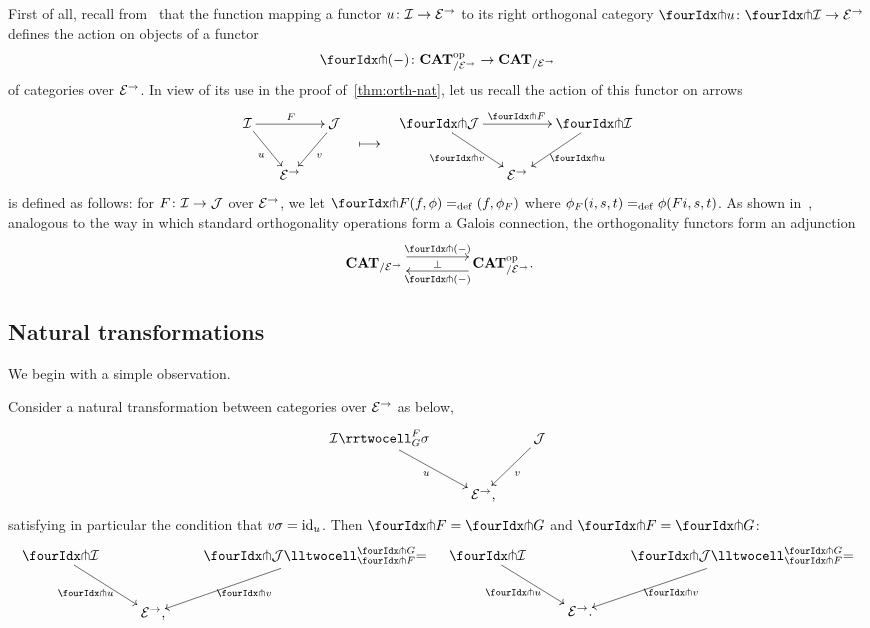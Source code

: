 \documentclass[reqno,10pt,a4paper,oneside,draft]{amsart}
\begin{document}
First of all, recall from~\cite{garner:small-object-argument} that the function mapping a functor $u \colon \mathcal{I} \to \mathcal{E}^\to$ to its right orthogonal category $\liftr{u} \co \liftr{\cal{I}} \to \catE^\to$ defines the action on objects of a functor
\[
  \liftr{\brarghole} \co \CAT_{/\catE^\to}^{\op} \to \CAT_{/\catE^\to}
\]
of categories over $\mathcal{E}^\to$.
In view of its use in the proof of~\cref{thm:orth-nat}, let us recall the action of this functor on arrows
\[
\begin{aligned}
\xymatrix@C-1em{
  \cal{I}
  \ar[dr]_{u}
  \ar[rr]^{F}
&&
  \cal{J}
  \ar[dl]^{v}
\\&
  \catE^\to
}
&&
\xymatrix{
  \ar@{}[d]|{\textstyle\longmapsto} \\
  {}
}
&&
\xymatrix@C-1em{
  \liftr{\cal{J}}
  \ar[dr]_{\liftr{v}}
  \ar[rr]^{\liftr{F}}
&&
  \liftr{\cal{I}}
  \ar[dl]^{\liftr{u}}
\\&
  \catE^\to
}
\end{aligned}
\]
is defined as follows: for $F \colon \mathcal{I} \to \mathcal{J}$ over $\mathcal{E}^\to$, we let $\liftr{F}(f,\phi) \defeq (f, \phi_F)$ where $\phi_F(i, s, t) =_{\operatorname{def}} \phi(Fi, s, t)$.
As shown in~\cite[Proposition~3.8]{garner:small-object-argument}, analogous to the way in which standard orthogonality operations form a Galois connection, the orthogonality functors form an adjunction
\begin{equation} \label{garner-adjunction}
\begin{gathered}
\xymatrix@C+2em{
  \CAT_{/\catE^\to}
  \ar@<5pt>[r]^-{\liftl{\brarghole}}
  \ar@{}[r]|-{\bot}
&
  \CAT_{/\catE^\to}^{\op} \rlap{.}
  \ar@<5pt>[l]^-{\liftr{\brarghole}}
}
\end{gathered}
\end{equation}

\subsection*{Natural transformations}

We begin with a simple observation.

\begin{proposition} \label{thm:orth-nat}
Consider a natural transformation between categories over $\mathcal{E}^\to$ as below,
\[
\xymatrix{
  \cal{I}
  \rrtwocell_G^F{\sigma}
 \ar[dr]_{u}
&&
  \cal{J}
  \ar[dl]^{v}
\\&
  \catE^\to
\rlap{,}}
\]
satisfying in particular the condition that $v \sigma = \operatorname{id}_u$.
Then $\liftr{F} = \liftr{G}$ and $\liftl{F} = \liftl{G}$:
\begin{align*}
\xymatrix{
  \liftr{\cal{I}}
  \ar[dr]_{\liftr{u}}
&&
  \liftr{\cal{J}}
  \lltwocell_{\liftr{F}}^{\liftr{G}}{=}
  \ar[dl]^{\liftr{v}}
\\&
  \catE^\to
\rlap{,}}
&&
\xymatrix{
  \liftl{\cal{I}}
  \ar[dr]_{\liftl{u}}
&&
  \liftl{\cal{J}}
  \lltwocell_{\liftl{F}}^{\liftl{G}}{=}
  \ar[dl]^{\liftl{v}}
\\&
  \catE^\to
\rlap{.}}
\end{align*}
\end{proposition}
\end{document}
